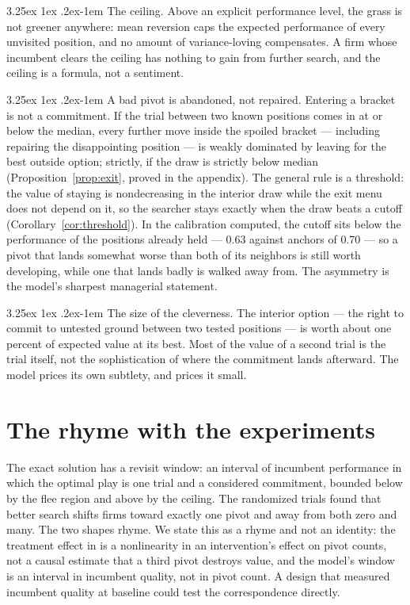 \documentclass[11pt]{article}
\makeatletter
\theoremstyle{itheads}
\renewcommand\paragraph{\@startsection{paragraph}{4}{\z@}%
  {3.25ex \@plus1ex \@minus.2ex}{-1em}%
  {\normalfont\normalsize\itshape}}
\makeatother
\begin{document}
\paragraph{The ceiling.} Above an explicit performance level, the grass
is not greener anywhere: mean reversion caps the expected performance
of every unvisited position, and no amount of variance-loving
compensates. A firm whose incumbent clears the ceiling has nothing to
gain from further search, and the ceiling is a formula, not a
sentiment.

\paragraph{A bad pivot is abandoned, not repaired.} Entering a bracket
is not a commitment. If the trial between two known positions comes in
at or below the median, every further move inside the spoiled bracket
--- including repairing the disappointing position --- is weakly
dominated by leaving for the best outside option; strictly, if the
draw is strictly below median (Proposition~\ref{prop:exit}, proved in
the appendix). The general rule is a threshold: the value of staying
is nondecreasing in the interior draw while the exit menu does not
depend on it, so the searcher stays exactly when the draw beats a
cutoff (Corollary~\ref{cor:threshold}). In the calibration computed,
the cutoff sits below the performance of the positions already held
--- 0.63 against anchors of 0.70 --- so a pivot that lands somewhat
worse than both of its neighbors is still worth developing, while one
that lands badly is walked away from. The asymmetry is the model's
sharpest managerial statement.

\paragraph{The size of the cleverness.} The interior option --- the
right to commit to untested ground between two tested positions --- is
worth about one percent of expected value at its best. Most of the
value of a second trial is the trial itself, not the sophistication of
where the commitment lands afterward. The model prices its own
subtlety, and prices it small.

\section{The rhyme with the experiments}

The exact solution has a revisit window: an interval of incumbent
performance in which the optimal play is one trial and a considered
commitment, bounded below by the flee region and above by the ceiling.
The randomized trials found that better search shifts firms toward
exactly one pivot and away from both zero and many. The two shapes
rhyme. We state this as a rhyme and not an identity: the treatment
effect in \citet{camuffo2024} is a nonlinearity in an intervention's
effect on pivot counts, not a causal estimate that a third pivot
destroys value, and the model's window is an interval in incumbent
quality, not in pivot count. A design that measured incumbent quality
at baseline could test the correspondence directly.
\end{document}
